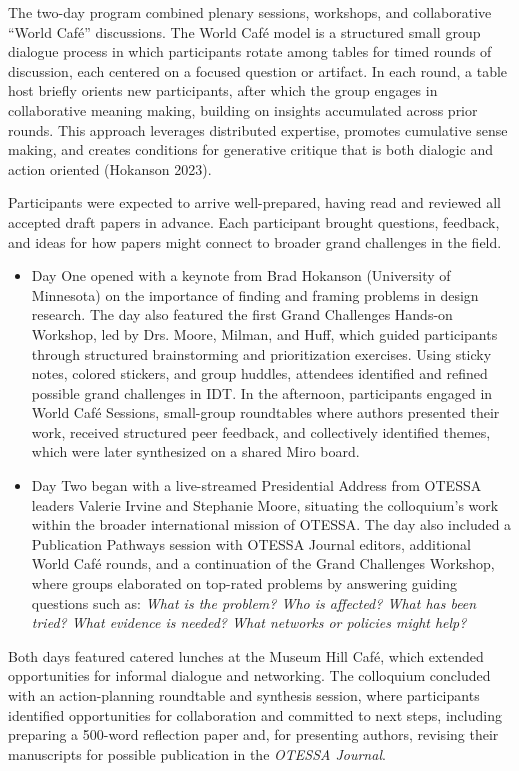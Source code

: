 \documentclass[
  letterpaper,
  DIV=11,
  numbers=noendperiod]{scrartcl}
\begin{document}
The two-day program combined plenary sessions, workshops, and
collaborative ``World Café'' discussions. The World Café model is a
structured small group dialogue process in which participants rotate
among tables for timed rounds of discussion, each centered on a focused
question or artifact. In each round, a table host briefly orients new
participants, after which the group engages in collaborative meaning
making, building on insights accumulated across prior rounds. This
approach leverages distributed expertise, promotes cumulative sense
making, and creates conditions for generative critique that is both
dialogic and action oriented (Hokanson 2023).

Participants were expected to arrive well-prepared, having read and
reviewed all accepted draft papers in advance. Each participant brought
questions, feedback, and ideas for how papers might connect to broader
grand challenges in the field.

\begin{itemize}
\item
  Day One opened with a keynote from Brad Hokanson (University of
  Minnesota) on the importance of finding and framing problems in design
  research. The day also featured the first Grand Challenges Hands-on
  Workshop, led by Drs. Moore, Milman, and Huff, which guided
  participants through structured brainstorming and prioritization
  exercises. Using sticky notes, colored stickers, and group huddles,
  attendees identified and refined possible grand challenges in IDT. In
  the afternoon, participants engaged in World Café Sessions,
  small-group roundtables where authors presented their work, received
  structured peer feedback, and collectively identified themes, which
  were later synthesized on a shared Miro board.
\item
  Day Two began with a live-streamed Presidential Address from OTESSA
  leaders Valerie Irvine and Stephanie Moore, situating the colloquium's
  work within the broader international mission of OTESSA. The day also
  included a Publication Pathways session with OTESSA Journal editors,
  additional World Café rounds, and a continuation of the Grand
  Challenges Workshop, where groups elaborated on top-rated problems by
  answering guiding questions such as: \emph{What is the problem? Who is
  affected? What has been tried? What evidence is needed? What networks
  or policies might help?}
\end{itemize}

Both days featured catered lunches at the Museum Hill Café, which
extended opportunities for informal dialogue and networking. The
colloquium concluded with an action-planning roundtable and synthesis
session, where participants identified opportunities for collaboration
and committed to next steps, including preparing a 500-word reflection
paper and, for presenting authors, revising their manuscripts for
possible publication in the \emph{OTESSA Journal}.
\end{document}
